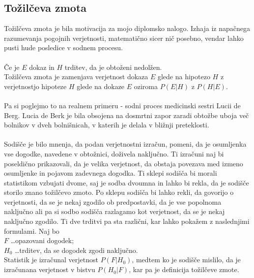 \documentclass[12pt,a4paper]{amsart}
\theoremstyle{definition} %
\theoremstyle{plain} %
\begin{document}
\subsection{Tožilčeva zmota}
Tožilčeva zmota je bila motivacija za mojo diplomsko nalogo. Izhaja iz napačnega razumevanja
pogojnih verjetnosti, matematično sicer nič posebno, vendar lahko pusti hude posledice v sodnem procesu.\\\\
Če je $E$ dokaz in $H$ trditev,  da je obtoženi nedolžen. \\
Tožilčeva zmota je zamenjava verjetnost dokaza $E$ glede na
hipotezo $H$ z verjetnostjo hipoteze $H$ glede na dokaze $E$ oziroma $P(E \lvert H)$ z $P(H \lvert E)$.\\\\
Pa si poglejmo to na realnem primeru - sodni proces medicinski sestri Lucii de Berg.  Lucia de Berk je bila obsojena na dosmrtni zapor zaradi obtožbe 
uboja več bolnikov v dveh bolnišnicah, v katerih je delala v bližnji preteklosti. \\\\
Sodišče je bilo mnenja, da podan verjetnostni izračun, pomeni, da je osumljenka vse dogodke, navedene v obtožnici, doživela naključno. Ti 
izračuni naj bi poseldično prikazovali, da je velika verjetnost, da obstaja povezava med izmeno osumljenke in pojavom zadevnega dogodka. Ti sklepi sodišča 
bi morali statistikom vzbujati dvome, saj je sodba dvoumna in lahko bi rekla, da je sodišče storilo znano tožilčevo zmoto. Po sklepu sodišča bi lahko rekli, 
da govorijo o verjetnosti, da se je nekaj zgodilo ob predpostavki, da je vse popolnoma naključno ali pa si sodbo sodišča razlagamo kot verjetnost, da se 
je nekaj naključno zgodilo. Ti dve trditvi pa sta različni, kar lahko pokažem z naslednjimi formulami. Naj bo\\
$F$ \dots opazovani dogodek;\\
$H_0$ \dots trditev, da se dogodek zgodi naključno.\\
Statistik je izračunal verjetnost $P(F \lvert H_0)$, medtem ko je sodišče mislilo, da je izračunana  verjetnost v bistvu $P(H_0 \lvert F)$, 
kar pa je definicija tožilčeve zmote.

\end{document}
